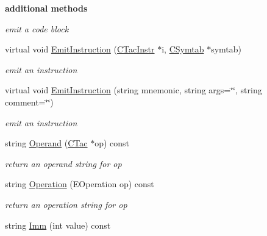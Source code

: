 \begin{Indent}{\bf additional methods}
\begin{DoxyCompactItemize}
\begin{DoxyCompactList}\small\item\em emit a code block \end{DoxyCompactList}\item 
virtual void \hyperlink{classCBackendx86_a0855ae189e08d402ea85a13df8153f13}{Emit\-Instruction} (\hyperlink{classCTacInstr}{C\-Tac\-Instr} $\ast$i, \hyperlink{classCSymtab}{C\-Symtab} $\ast$symtab)
\begin{DoxyCompactList}\small\item\em emit an instruction \end{DoxyCompactList}\item 
\hypertarget{classCBackendx86_aecd080f793a8281d3b3c38c203f108ba}{virtual void \hyperlink{classCBackendx86_aecd080f793a8281d3b3c38c203f108ba}{Emit\-Instruction} (string mnemonic, string args=\char`\"{}\char`\"{}, string comment=\char`\"{}\char`\"{})}\label{classCBackendx86_aecd080f793a8281d3b3c38c203f108ba}

\begin{DoxyCompactList}\small\item\em emit an instruction \end{DoxyCompactList}\item 
\hypertarget{classCBackendx86_a6141d51432ac2c872a77a22992a01c1a}{string \hyperlink{classCBackendx86_a6141d51432ac2c872a77a22992a01c1a}{Operand} (\hyperlink{classCTac}{C\-Tac} $\ast$op) const }\label{classCBackendx86_a6141d51432ac2c872a77a22992a01c1a}

\begin{DoxyCompactList}\small\item\em return an operand string for {\itshape op} \end{DoxyCompactList}\item 
\hypertarget{classCBackendx86_a6ef56486e444fbe4102cd67fda2e6d19}{string \hyperlink{classCBackendx86_a6ef56486e444fbe4102cd67fda2e6d19}{Operation} (E\-Operation op) const }\label{classCBackendx86_a6ef56486e444fbe4102cd67fda2e6d19}

\begin{DoxyCompactList}\small\item\em return an operation string for {\itshape op} \end{DoxyCompactList}\item 
\hypertarget{classCBackendx86_a7a189a9d803ab2ec8dc86378ca4d84d5}{string \hyperlink{classCBackendx86_a7a189a9d803ab2ec8dc86378ca4d84d5}{Imm} (int value) const }\label{classCBackendx86_a7a189a9d803ab2ec8dc86378ca4d84d5}


\end{DoxyCompactItemize}
\end{Indent}
